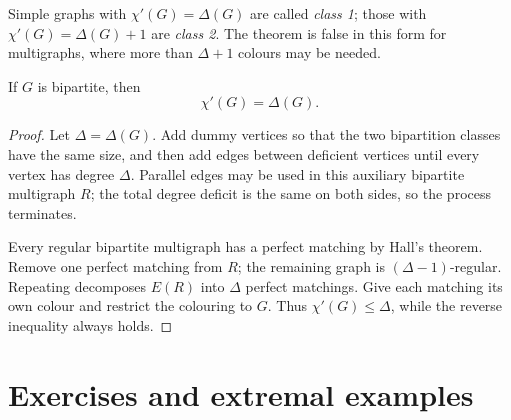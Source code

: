 \begin{noteremark}
Simple graphs with $\chi'(G)=\Delta(G)$ are called \emph{class 1}; those with
$\chi'(G)=\Delta(G)+1$ are \emph{class 2}.  The theorem is false in this form
for multigraphs, where more than $\Delta+1$ colours may be needed.
\end{noteremark}
\begin{notetheorem}
If $G$ is bipartite, then
\[
  \chi'(G)=\Delta(G).
\]
\end{notetheorem}
\begin{proof}
Let $\Delta=\Delta(G)$.  Add dummy vertices so that the two bipartition
classes have the same size, and then add edges between deficient vertices
until every vertex has degree $\Delta$.  Parallel edges may be used in this
auxiliary bipartite multigraph $R$; the total degree deficit is the same on
both sides, so the process terminates.

Every regular bipartite multigraph has a perfect matching by Hall's theorem.
Remove one perfect matching from $R$; the remaining graph is
$(\Delta-1)$-regular.  Repeating decomposes $E(R)$ into $\Delta$ perfect
matchings.  Give each matching its own colour and restrict the colouring to
$G$.  Thus $\chi'(G)\le\Delta$, while the reverse inequality always holds.
\end{proof}
\section{Exercises and extremal examples}


